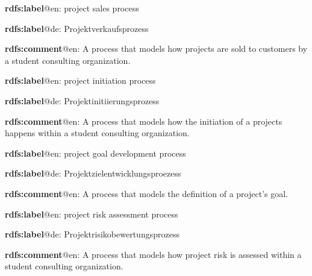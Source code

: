 \documentclass[a4paper, DIV=13, BCOR=0cm]{scrbook}
\begin{document}
\begin{mdframed}[style=onto-2, frametitle={Project\_Sales\_Process}]
	{%
		\begin{compactitem}
			\item \textbf{rdfs:label}@en: project sales process
			\item \textbf{rdfs:label}@de: Projektverkaufsprozess
			\item \textbf{rdfs:comment}@en: A process that models how projects are sold to customers by a student consulting organization.
		\end{compactitem}
	} %
\end{mdframed}

\begin{mdframed}[style=onto-2, frametitle={Project\_Initiation\_Process}]
	{%
		\begin{compactitem}
			\item \textbf{rdfs:label}@en: project initiation process
			\item \textbf{rdfs:label}@de: Projektinitiierungsprozess
			\item \textbf{rdfs:comment}@en: A process that models how the initiation of a projects happens within a student consulting organization.
		\end{compactitem}
	} %
\end{mdframed}

\begin{mdframed}[style=onto-3, frametitle={Project\_Goal\_Development\_Process}]
	{%
		\begin{compactitem}
			\item \textbf{rdfs:label}@en: project goal development process
			\item \textbf{rdfs:label}@de: Projektzielentwicklungsproezess
			\item \textbf{rdfs:comment}@en: A process that models the definition of a project's goal.
		\end{compactitem}
	} %
\end{mdframed}

\begin{mdframed}[style=onto-3, frametitle={Project\_Risk\_Assessment\_Process}]
	{%
		\begin{compactitem}
			\item \textbf{rdfs:label}@en: project risk assessment process
			\item \textbf{rdfs:label}@de: Projektrisikobewertungsprozess
			\item \textbf{rdfs:comment}@en: A process that models how project risk is assessed within a student consulting organization.
		\end{compactitem}
	} %
\end{mdframed}
\end{document}
